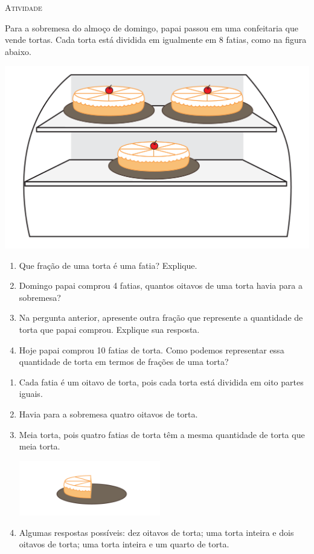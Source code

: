 \documentclass[10 pt,usenames,dvipsnames, oneside]{article}
\begin{document}
\bigskip
\begin{center}
{\Large \scshape Atividade}
\end{center}
\fi

Para a sobremesa do almoço de domingo, papai passou em uma confeitaria que vende tortas.
Cada torta está dividida em  igualmente em 8 fatias, como na figura abaixo.

\begin{center}
\includegraphics[width=.6\textwidth, keepaspectratio]{ativ3_fig01.png}
\end{center}

\begin{enumerate} [label=\alph*)] %
  \item     Que fração de uma torta é uma fatia? Explique.
  \item     Domingo papai comprou 4 fatias, quantos oitavos de uma torta havia para a sobremesa?
  \item     Na pergunta anterior, apresente outra fração que represente a quantidade de torta que papai comprou. Explique sua resposta.
  \item     Hoje papai comprou 10 fatias de torta. Como podemos representar essa quantidade de torta em termos de frações de uma torta?
\end{enumerate} %

\ifdefined\prof

\begin{solucao}

\begin{enumerate} [label=\alph*)] %
    \item       Cada fatia é um oitavo de torta, pois cada torta está dividida em oito partes iguais.
    \item       Havia para a sobremesa quatro oitavos de torta.
    \item       Meia torta, pois quatro fatias de torta têm a mesma quantidade de torta que meia torta.

  \begin{center}
  \includegraphics[width=175pt, keepaspectratio]{ativ3_resposta.png}
  \end{center}

    \item       Algumas respostas possíveis: dez oitavos de torta;  uma torta inteira e dois oitavos de torta; uma torta inteira e um quarto de torta.
\end{enumerate} %

\end{solucao}
\fi
\end{document}
